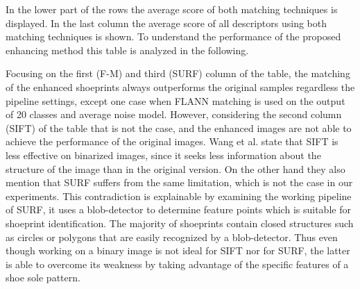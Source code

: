 \documentclass[draft,final]{vutinfth} %
\begin{document}
In the lower part of the rows the average score of both matching techniques is displayed.
In the last column the average score of all descriptors using both matching techniques is shown.
To understand the performance of the proposed enhancing method this table is analyzed in the following.
\par
Focusing on the first (F-M) and third (SURF) column of the table, the matching of the enhanced shoeprints always outperforms the original samples regardless the pipeline settings, except one case when FLANN matching is used on the output of 20 classes and average noise model.
However, considering the second column (SIFT) of the table that is not the case, and the enhanced images are not able to achieve the performance of the original images.
Wang et al. \cite{wang2017manifold} state that SIFT is less effective on binarized images, since it seeks less information about the structure of the image than in the original version.
On the other hand they also mention that SURF suffers from the same limitation, which is not the case in our experiments.
This contradiction is explainable by examining the working pipeline of SURF, it uses a blob-detector to determine feature points which is suitable for shoeprint identification.
The majority of shoeprints contain closed structures such as circles or polygons that are easily recognized by a blob-detector.
Thus even though working on a binary image is not ideal for SIFT nor for SURF, the latter is able to overcome its weakness by taking advantage of the specific features of a shoe sole pattern.
\end{document}
